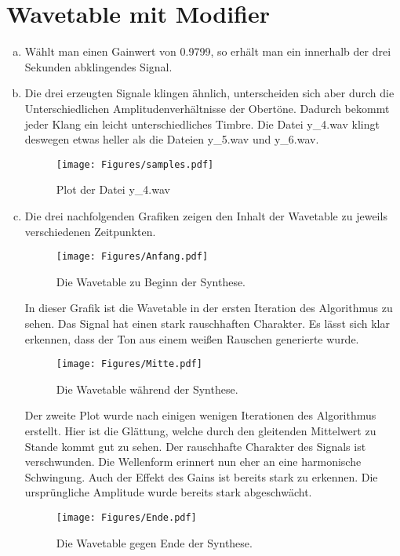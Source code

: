 \chapter{Wavetable mit Modifier}


\begin{enumerate}[a)]
\item
Wählt man einen Gainwert von 0.9799, so erhält man ein innerhalb der drei Sekunden abklingendes Signal.
\item
Die drei erzeugten Signale klingen ähnlich, unterscheiden sich aber durch die Unterschiedlichen Amplitudenverhältnisse der Obertöne. Dadurch bekommt jeder Klang ein leicht unterschiedliches Timbre. Die Datei y_4.wav klingt deswegen etwas heller als die Dateien y_5.wav und y_6.wav.
\begin{figure}[H]
    \center
    \texttt{[image: Figures/samples.pdf]}
    \caption{Plot der Datei y\_4.wav}
    \label{fig:bs0}
\end{figure}
\item
Die drei nachfolgenden Grafiken zeigen den Inhalt der Wavetable zu jeweils verschiedenen Zeitpunkten.

\begin{figure}[H]
    \center
    \texttt{[image: Figures/Anfang.pdf]}
    \caption{Die Wavetable zu Beginn der Synthese.}
    \label{fig:bs1}
\end{figure}

In dieser Grafik ist die Wavetable in der ersten Iteration des Algorithmus zu sehen.
Das Signal hat einen stark rauschhaften Charakter.
Es lässt sich klar erkennen, dass der Ton aus einem weißen Rauschen generierte wurde. 

\begin{figure}[H]
    \center
    \texttt{[image: Figures/Mitte.pdf]}
    \caption{Die Wavetable während der Synthese.}
    \label{fig:bs1}
\end{figure}

Der zweite Plot wurde nach einigen wenigen Iterationen des Algorithmus erstellt.
Hier ist die Glättung, welche durch den gleitenden Mittelwert zu Stande kommt gut zu sehen.
Der rauschhafte Charakter des Signals ist verschwunden.
Die Wellenform erinnert nun eher an eine harmonische Schwingung.
Auch der Effekt des Gains ist bereits stark zu erkennen.
Die ursprüngliche Amplitude wurde bereits stark abgeschwächt.

\begin{figure}[H]
    \center
    \texttt{[image: Figures/Ende.pdf]}
    \caption{Die Wavetable gegen Ende der Synthese.}
    \label{fig:bs1}
\end{figure}


\end{enumerate}
